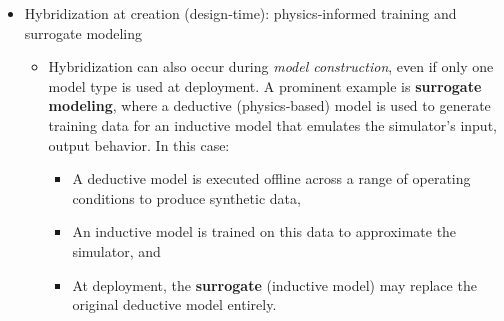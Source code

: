 \documentclass[
]{article}
\providecommand{\tightlist}{%
  \setlength{\itemsep}{0pt}\setlength{\parskip}{0pt}}
\begin{document}
\begin{itemize}
\begin{itemize}
\begin{itemize}
\begin{itemize}
        \begin{itemize}
        \tightlist
        \item
          {[}Example 1 of hyrbidization at runtime{]}
        \item
          {[}Example 2 of hyrbidization at runtime{]}\\
          When the operational output is produced by \textbf{combining
          contributions from both deductive and inductive models during
          deployment}, this constitutes \textbf{hybridization at usage}
          (EX1). The defining feature is that \emph{both} model types
          are present and active in the deployed system, and the final
          prediction depends on their coordinated execution.\\
          To make the concept operational, it is useful to distinguish
          hybridization by \emph{when} and \emph{how} the integration
          occurs: \textbf{hybridization at usage (run‑time integration)}
          versus \textbf{hybridization at creation (design‑time
          integration)}.
        \end{itemize}
      \end{itemize}
    \item
      Hybridization at creation (design‑time): physics‑informed training
      and surrogate modeling

      \begin{itemize}
      \tightlist
      \item
        Hybridization can also occur during \emph{model construction},
        even if only one model type is used at deployment. A prominent
        example is \textbf{surrogate modeling}, where a deductive
        (physics‑based) model is used to generate training data for an
        inductive model that emulates the simulator's input, output
        behavior. In this case:

        \begin{itemize}
        \tightlist
        \item
          A deductive model is executed offline across a range of
          operating conditions to produce synthetic data,
        \item
          An inductive model is trained on this data to approximate the
          simulator, and
        \item
          At deployment, the \textbf{surrogate} (inductive model) may
          replace the original deductive model entirely.
        \end{itemize}
      \end{itemize}


\end{itemize}
\end{itemize}
\end{itemize}
\end{document}
